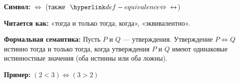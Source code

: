 
\hypertarget{def-equivalence}{}
\begin{definition} %

\textbf{Символ:} $\iff$ (также $\TermEquivalence{\leftrightarrow}$)

\textbf{Читается как:} «тогда и только тогда, когда», «эквивалентно».

\textbf{Формальная семантика:}
Пусть $P$ и $Q$ — утверждения. Утверждение $P \iff Q$ истинно тогда и только тогда, когда утверждения $P$ и $Q$ имеют одинаковые истинностные значения (оба истинны или оба ложны).

\textbf{Пример:} $(2 < 3) \iff (3 > 2)$
\end{definition}